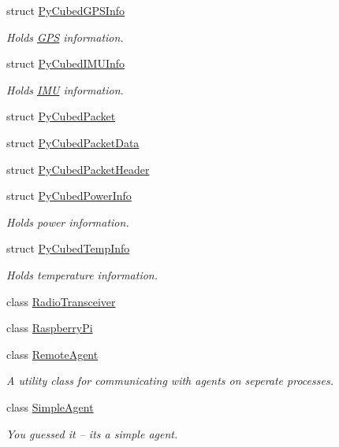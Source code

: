 \begin{DoxyCompactItemize}
\item 
struct \hyperlink{structcubesat_1_1PyCubedGPSInfo}{Py\+Cubed\+G\+P\+S\+Info}
\begin{DoxyCompactList}\small\item\em Holds \hyperlink{classcubesat_1_1GPS}{G\+PS} information. \end{DoxyCompactList}\item 
struct \hyperlink{structcubesat_1_1PyCubedIMUInfo}{Py\+Cubed\+I\+M\+U\+Info}
\begin{DoxyCompactList}\small\item\em Holds \hyperlink{classcubesat_1_1IMU}{I\+MU} information. \end{DoxyCompactList}\item 
struct \hyperlink{structcubesat_1_1PyCubedPacket}{Py\+Cubed\+Packet}
\item 
struct \hyperlink{structcubesat_1_1PyCubedPacketData}{Py\+Cubed\+Packet\+Data}
\item 
struct \hyperlink{structcubesat_1_1PyCubedPacketHeader}{Py\+Cubed\+Packet\+Header}
\item 
struct \hyperlink{structcubesat_1_1PyCubedPowerInfo}{Py\+Cubed\+Power\+Info}
\begin{DoxyCompactList}\small\item\em Holds power information. \end{DoxyCompactList}\item 
struct \hyperlink{structcubesat_1_1PyCubedTempInfo}{Py\+Cubed\+Temp\+Info}
\begin{DoxyCompactList}\small\item\em Holds temperature information. \end{DoxyCompactList}\item 
class \hyperlink{classcubesat_1_1RadioTransceiver}{Radio\+Transceiver}
\item 
class \hyperlink{classcubesat_1_1RaspberryPi}{Raspberry\+Pi}
\item 
class \hyperlink{classcubesat_1_1RemoteAgent}{Remote\+Agent}
\begin{DoxyCompactList}\small\item\em A utility class for communicating with agents on seperate processes. \end{DoxyCompactList}\item 
class \hyperlink{classcubesat_1_1SimpleAgent}{Simple\+Agent}
\begin{DoxyCompactList}\small\item\em You guessed it -- it\textquotesingle{}s a simple agent. \end{DoxyCompactList}\item 

\end{DoxyCompactItemize}
